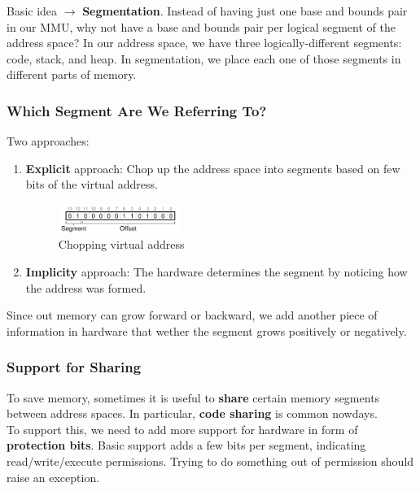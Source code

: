 Basic idea $\rightarrow$ \textbf{Segmentation}. Instead of having just one base
and bounds pair in our MMU, why not have a base and bounds pair per logical
segment of the address space? In our address space, we have three
logically-different segments: code, stack, and heap. In segmentation, we place
each one of those segments in different parts of memory.

\subsubsection{Which Segment Are We Referring To?}

Two approaches:

\begin{enumerate}
    \item \textbf{Explicit} approach: Chop up the address space into segments
        based on few bits of the virtual address.

        \begin{figure}[h!]
            \begin{center}
                \includegraphics[width=4cm]{img/explicit.png}
                \caption{Chopping virtual address}
            \end{center}
        \end{figure}
    \item \textbf{Implicity} approach: The hardware determines the segment by
        noticing how the address was formed.
\end{enumerate}

Since out memory can grow forward or backward, we add another piece of
information in hardware that wether the segment grows positively or negatively.

\subsubsection{Support for Sharing}

To save memory, sometimes it is useful to \textbf{share} certain memory
segments between address spaces. In particular, \textbf{code sharing} is common
nowdays.\\

To support this, we need to add more support for hardware in form of
\textbf{protection bits}. Basic support adds a few bits per segment, indicating
read/write/execute permissions. Trying to do something out of permission should
raise an exception.


